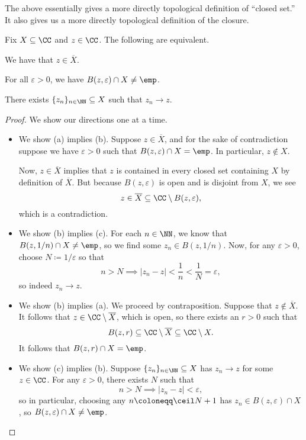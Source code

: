 The above essentially gives a more directly topological definition of ``closed set.'' It also gives us a more directly topological definition of the closure.
\begin{lemma}
	Fix $X\subseteq\CC$ and $z\in\CC$. The following are equivalent.
	\begin{listalph}
		\item We have that $z\in\overline X$.
		\item For all $\varepsilon>0$, we have $B(z,\varepsilon)\cap X\ne\emp$.
		\item There exists $\{z_n\}_{n\in\NN}\subseteq X$ such that $z_n\to z$.
	\end{listalph}
\end{lemma}
\begin{proof}
	We show our directions one at a time.
	\begin{itemize}
		\item We show (a) implies (b). Suppose $z\in\overline X$, and for the sake of contradiction suppose we have $\varepsilon>0$ such that $B(z,\varepsilon)\cap X=\emp$. In particular, $z\notin X$.

		Now, $z\in\overline X$ implies that $z$ is contained in every closed set containing $X$ by definition of $\overline X$. But because $B(z,\varepsilon)$ is open and is disjoint from $X$, we see
		\[z\in\overline X\subseteq\CC\setminus B(z,\varepsilon),\]
		which is a contradiction.
		\item We show (b) implies (c). For each $n\in\NN$, we know that $B(z,1/n)\cap X\ne\emp$, so we find some $z_n\in B(z,1/n)$. Now, for any $\varepsilon>0$, choose $N\coloneqq 1/\varepsilon$ so that
		\[n>N\implies|z_n-z|<\frac1n<\frac1N=\varepsilon,\]
		so indeed $z_n\to z$.

		\item We show (b) implies (a). We proceed by contraposition. Suppose that $z\notin\overline X$. It follows that $z\in\CC\setminus\overline X$, which is open, so there exists an $r>0$ such that
		\[B(z,r)\subseteq\CC\setminus\overline X\subseteq\CC\setminus X.\]
		It follows that $B(z,r)\cap X=\emp$.

		\item We show (c) implies (b). Suppose $\{z_n\}_{n\in\NN}\subseteq X$ has $z_n\to z$ for some $z\in\CC$. For any $\varepsilon>0$, there exists $N$ such that
		\[n>N\implies|z_n-z|<\varepsilon,\]
		so in particular, choosing any $n\coloneqq \ceil N+1$ has $z_n\in B(z,\varepsilon)\cap X$, so $B(z,\varepsilon)\cap X\ne\emp$.
		\qedhere
	\end{itemize}
\end{proof}

